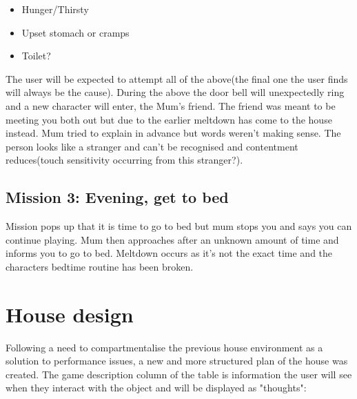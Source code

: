 \documentclass[11pt]{report}
\begin{document}
\begin{itemize}
\item Hunger/Thirsty
\item Upset stomach or cramps
\item Toilet?
\end{itemize}

The user will be expected to attempt all of the above(the final one the user finds will always be the cause). During the above the door bell will unexpectedly ring and a new character will enter, the Mum's friend. The friend was meant to be meeting you both out but due to the earlier meltdown has come to the house instead. Mum tried to explain in advance but words weren't making sense. The person looks like a stranger and can't be recognised and contentment reduces(touch sensitivity occurring from this stranger?). 

\subsection*{Mission 3: Evening, get to bed}
Mission pops up that it is time to go to bed but mum stops you and says you can continue playing. Mum then approaches after an unknown amount of time and informs you to go to bed. Meltdown occurs as it's not the exact time and the characters bedtime routine has been broken.

\section{House design}
Following a need to compartmentalise the previous house environment as a solution to performance issues, a new and more structured plan of the house was created. The game description column of the table is information the user will see when they interact with the object and will be displayed as "thoughts":
\end{document}
